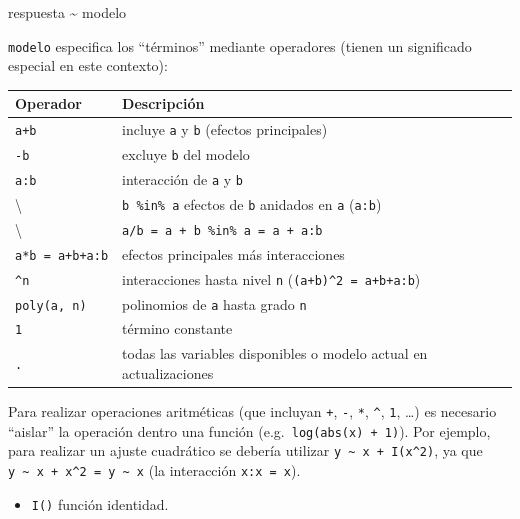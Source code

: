 \documentclass[
]{book}
\newenvironment{Shaded}{\begin{snugshade}}{\end{snugshade}}
\newcommand{\NormalTok}[1]{#1}
\newcommand{\SpecialCharTok}[1]{\textcolor[rgb]{0.00,0.00,0.00}{#1}}
\providecommand{\tightlist}{%
  \setlength{\itemsep}{0pt}\setlength{\parskip}{0pt}}
\theoremstyle{break}
\begin{document}
\begin{Shaded}
\begin{Highlighting}[]
\NormalTok{respuesta }\SpecialCharTok{\textasciitilde{}}\NormalTok{ modelo}
\end{Highlighting}
\end{Shaded}

\texttt{modelo} especifica los ``términos'' mediante operadores (tienen un significado especial en este contexto):

\begin{longtable}[]{@{}ll@{}}
\toprule
Operador & Descripción \\
\midrule
\endhead
\texttt{a+b} & incluye \texttt{a} y \texttt{b} (efectos principales) \\
\texttt{-b} & excluye \texttt{b} del modelo \\
\texttt{a:b} & interacción de \texttt{a} y \texttt{b} \\
\textbackslash{} & \texttt{b\ \%in\%\ a} efectos de \texttt{b} anidados en \texttt{a} (\texttt{a:b}) \\
\textbackslash{} & \texttt{a/b\ =\ a\ +\ b\ \%in\%\ a\ =\ a\ +\ a:b} \\
\texttt{a*b\ =\ a+b+a:b} & efectos principales más interacciones \\
\texttt{\^{}n} & interacciones hasta nivel \texttt{n} (\texttt{(a+b)\^{}2\ =\ a+b+a:b}) \\
\texttt{poly(a,\ n)} & polinomios de \texttt{a} hasta grado \texttt{n} \\
\texttt{1} & término constante \\
\texttt{.} & todas las variables disponibles o modelo actual en actualizaciones \\
\bottomrule
\end{longtable}

Para realizar operaciones aritméticas (que incluyan \texttt{+}, \texttt{-}, \texttt{*}, \texttt{\^{}}, \texttt{1}, \ldots)
es necesario ``aislar'' la operación
dentro una función (e.g.~\texttt{log(abs(x)\ +\ 1)}).
Por ejemplo, para realizar un ajuste cuadrático se debería utilizar \texttt{y\ \textasciitilde{}\ x\ +\ I(x\^{}2)}, ya que \texttt{y\ \textasciitilde{}\ x\ +\ x\^{}2\ =\ y\ \textasciitilde{}\ x} (la interacción \texttt{x:x\ =\ x}).

\begin{itemize}
\tightlist
\item
  \texttt{I()} función identidad.
\end{itemize}
\end{document}
